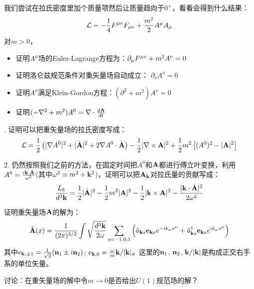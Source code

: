 \documentclass[CJK]{beamer}
\begin{document}
\begin{frame}
\bch
我们尝试在拉氏密度里加个质量项然后让质量趋向于$0^+$，看看会得到什么结果：
$${\mathcal{L}} = -\frac{1}{4}{F^{\mu\nu}}{F_{\mu\nu}} + \frac{m^2}{2} A^\mu A_\mu $$
对$m>0$，
\begin{itemize}
\item{证明$A^\mu$场的Euler-Lagrange方程为：$\partial_\mu {F^{\mu\nu}} + m^2 A^\nu = 0$}
\item{证明洛仑兹规范条件对重矢量场自动成立： $\partial_\nu A^\nu = 0$}
\item{证明$A^\nu$满足Klein-Gordon方程：$(\partial^2 + m^2) A^\nu = 0$}
\item{证明$(-\nabla^2+m^2)A^0 = \nabla \cdot \frac{d{\mathbf{A}}}{dt}$}
\end{itemize}

\ech
\end{frame}

\begin{frame}
. 证明可以把重矢量场的拉氏密度写成：
$${\mathcal{L}} = \frac{1}{2} \left( |\nabla A^0|^2  + |\dot{{\mathbf{A}}}|^2 + 2 \nabla A^0 \cdot \dot{{\mathbf{A}}} \right) - \frac{1}{2}|\nabla \times {\mathbf{A}}|^2 + \frac{1}{2}m^2 \left[(A^0)^2 - |{\mathbf{A}}|^2\right]$$ 

2. 仍然按照我们之前的方法，在固定时间把$A^0$和${\mathbf{A}}$都进行傅立叶变换，利用$A^0 = \frac{i{\mathbf{k}} \cdot\dot {{\mathbf{A}}}}{\omega^2}$(其中$\omega^2 \equiv m^2 + {\mathbf{k}}^2$)，证明可以把${\mathbf{A}}_{\mathbf{k}}$对拉氏量的贡献写成：
$$\frac{L_k}{d^3{\mathbf{k}}} = \frac{1}{2}|\dot{{\mathbf{A}}}|^2 - \frac{1}{2}m^2|{\mathbf{A}}|^2- \frac{1}{2}|{\mathbf{k}}\times{\mathbf{A}}|^2 - \frac{|{\mathbf{k}}\cdot\dot{{\mathbf{A}}}|^2}{2\omega^2}$$

\ech
\end{frame}

\begin{frame}
\bch
证明重矢量场${\mathbf{A}}$的解为：
$$\hat{{\mathbf{A}}}(x) = \frac{1}{(2\pi)^{3/2}} \int \sqrt{\frac{d^3{\mathbf{k}}}{2\omega}} \sum_{s=-1,0,1}\left({\hat{a}}_{{\mathbf{k}} s} \mathbf{e}_{{\mathbf{k}} s} e^{-ik_\mu x^\mu} + {\hat{a}^\dagger}_{{\mathbf{k}} s} \mathbf{e}_{{\mathbf{k}} s} e^{ik_\mu x^\mu}\right) $$
其中$\mathrm{e}_{{\mathbf{k}},\pm 1} = \frac{1}{\sqrt{2}}({\mathbf{n}}_1 \pm {\dot{\imath}} {\mathbf{n}}_2)$; $\mathrm{e}_{{\mathbf{k}}, 0} = \frac{\omega}{m} {\mathbf{k}}/|{\mathbf{k}}|$。这里的${\mathbf{n}}_1$, ${\mathbf{n}}_2$, ${\mathbf{k}}/|{\mathbf{k}}|$是构成正交右手系的单位矢量。 

\skipline

讨论：在重矢量场的解中令$m\rightarrow 0$是否给出$U(1)$规范场的解？
\ech
\end{frame}
\end{document}
